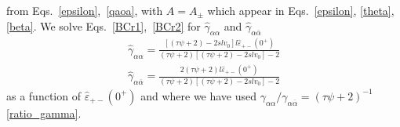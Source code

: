 \documentclass[pre,aps,superscriptaddress,nofootinbib]{revtex4}
\begin{document}
from Eqs.~\ref{epsilon},~\ref{qaoa}, with $A = A_{\pm}$ which appear in Eqs.~\ref{epsilon}, \ref{theta}, \ref{beta}. We solve Eqs.~\ref{BCr1},~\ref{BCr2} for $\hat{\gamma}_{\alpha\alpha}$ and $\hat{\gamma}_{\alpha\overline{\alpha}}$
\begin{eqnarray}
\label{hgaa}
\hat{\gamma}_{\alpha\alpha} = \frac{[(\tau\psi + 2) - 2 s l v_0] l \hat{\varepsilon}_{+-}(0^+)}{(\tau \psi + 2) [(\tau\psi + 2) - 2 s l v_0] - 2}\\
\label{hgaoa}
\hat{\gamma}_{\alpha\overline{\alpha}} = \frac{2 (\tau\psi + 2) l \hat{\varepsilon}_{+-}(0^+)}{(\tau \psi + 2) [(\tau\psi + 2) - 2 s l v_0] - 2}
\end{eqnarray}
as a function of $\hat{\varepsilon}_{+-}(0^+)$ and where we have used $\gamma_{\alpha\alpha}/\gamma_{\alpha\overline{\alpha}} = (\tau \psi + 2)^{-1}$ \eqref{ratio_gamma}.\\
\end{document}
